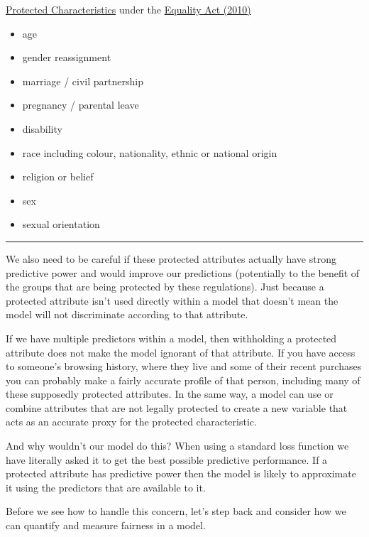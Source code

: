 \documentclass[
  12pt,
]{book}
\begin{document}
\href{https://www.gov.uk/discrimination-your-rights}{Protected Characteristics} under the \href{https://www.legislation.gov.uk/ukpga/2010/15/contents}{Equality Act (2010)}

\begin{itemize}
\item
  age
\item
  gender reassignment
\item
  marriage / civil partnership
\item
  pregnancy / parental leave
\item
  disability
\item
  race including colour, nationality, ethnic or national origin
\item
  religion or belief
\item
  sex
\item
  sexual orientation
\end{itemize}

\begin{center}\rule{0.5\linewidth}{0.5pt}\end{center}

We also need to be careful if these protected attributes actually have strong predictive power and would improve our predictions (potentially to the benefit of the groups that are being protected by these regulations). Just because a protected attribute isn't used directly within a model that doesn't mean the model will not discriminate according to that attribute.

If we have multiple predictors within a model, then withholding a protected attribute does not make the model ignorant of that attribute. If you have access to someone's browsing history, where they live and some of their recent purchases you can probably make a fairly accurate profile of that person, including many of these supposedly protected attributes. In the same way, a model can use or combine attributes that are not legally protected to create a new variable that acts as an accurate proxy for the protected characteristic.

And why wouldn't our model do this? When using a standard loss function we have literally asked it to get the best possible predictive performance. If a protected attribute has predictive power then the model is likely to approximate it using the predictors that are available to it.

Before we see how to handle this concern, let's step back and consider how we can quantify and measure fairness in a model.
\end{document}
